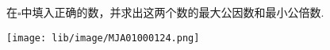 在$\square$中填入正确的数，并求出这两个数的最大公因数和最小公倍数.\\
\begin{center}
	\texttt{[image: lib/image/MJA01000124.png]}
	\vspace{0.5cm}
\end{center}